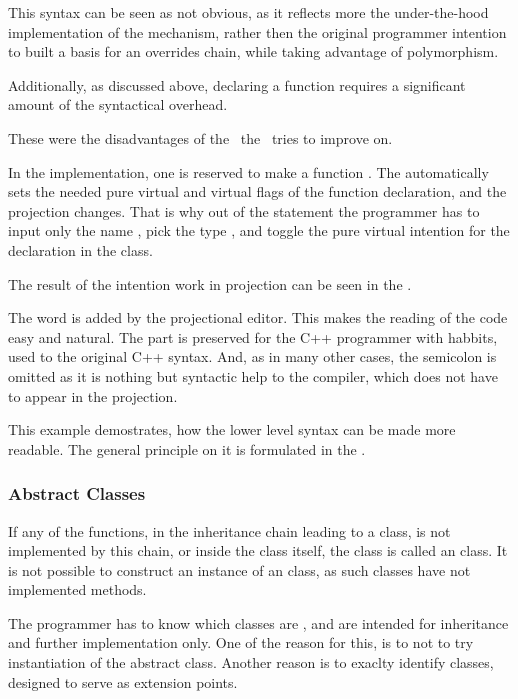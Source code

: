 This syntax can be seen as not obvious, as it reflects more the under-the-hood implementation of the mechanism,
rather then the original programmer intention to built a basis for an overrides chain, while taking advantage of 
polymorphism.

Additionally, as discussed above, declaring a  function requires a significant amount of the syntactical
overhead. 

These were the disadvantages of the \cpppl\ the \pcpp\ tries to improve on.

In the \pcpp implementation, one  is reserved to make a function . The  automatically
sets the needed pure virtual and virtual flags of the function declaration, and the projection changes. That is why out of the 
statement  the programmer has to input only the name , pick the type , and
toggle the pure virtual intention for the declaration in the  class.

The result of the intention work in projection can be seen in the .


The word  is added by the projectional editor. This makes the reading of the code easy and natural.
The  part is preserved for the C++ programmer with habbits, used to the original C++ syntax. And, as in many other cases, 
the semicolon is omitted as it is nothing but syntactic help to the compiler, which does not have to appear 
in the projection. 

This example demostrates, how the lower level syntax can be made more readable. The general principle on it is formulated in
the .

\subsubsection{Abstract Classes}
\label{abstractclasses}

If any of the  functions, in the inheritance chain leading to a class, is not implemented by this chain, 
or inside the class itself, the class is called an  class. It is not possible to construct an instance of an
 class, as such classes have not implemented methods.

The programmer has to know which classes are ,
and are intended for inheritance and further implementation only. One of the reason for this, is to not to try instantiation of
the abstract class. Another reason is to exaclty identify  classes, designed to serve as extension points.

